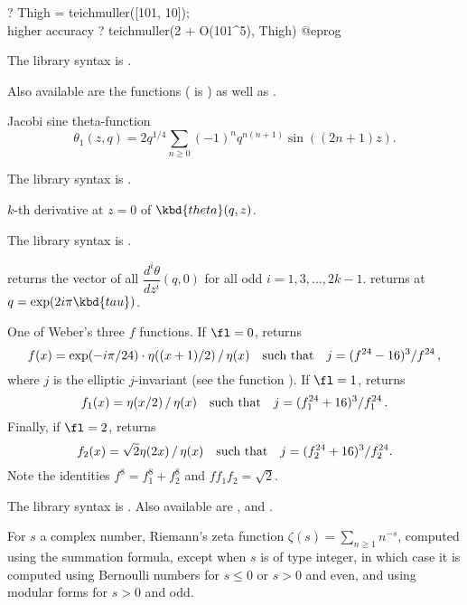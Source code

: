 ? Thigh = teichmuller([101, 10]); \\ higher accuracy
? teichmuller(2 + O(101^5), Thigh)
@eprog

The library syntax is .

Also available are the functions  ( is
) as well as
.

\label{se:theta}
Jacobi sine theta-function
$$ \theta_1(z, q) = 2q^{1/4} \sum_{n\geq 0} (-1)^n q^{n(n+1)} \sin((2n+1)z).$$

The library syntax is .

\label{se:thetanullk}
$k$-th derivative at $z=0$ of $\kbd{theta}(q,z)$.

The library syntax is .

 returns the vector
of all $\dfrac{d^i\theta}{dz^i}(q,0)$ for all odd $i = 1, 3, \dots, 2k-1$.
 returns
 at $q = \exp(2i\pi \kbd{tau})$.

\label{se:weber}
One of Weber's three $f$ functions.
If $\fl=0$, returns
$$f(x)=\exp(-i\pi/24)\cdot\eta((x+1)/2)\,/\,\eta(x) \quad\hbox{such that}\quad
j=(f^{24}-16)^3/f^{24}\,,$$
where $j$ is the elliptic $j$-invariant  (see the function ).
If $\fl=1$, returns
$$f_1(x)=\eta(x/2)\,/\,\eta(x)\quad\hbox{such that}\quad
j=(f_1^{24}+16)^3/f_1^{24}\,.$$
Finally, if $\fl=2$, returns
$$f_2(x)=\sqrt{2}\eta(2x)\,/\,\eta(x)\quad\hbox{such that}\quad
j=(f_2^{24}+16)^3/f_2^{24}.$$
Note the identities $f^8=f_1^8+f_2^8$ and $ff_1f_2=\sqrt2$.

The library syntax is .
Also available are ,
 and .

\label{se:zeta}
For $s$ a complex number, Riemann's zeta
function  $\zeta(s)=\sum_{n\ge1}n^{-s}$,
computed using the  summation formula, except
when $s$ is of type integer, in which case it is computed using
Bernoulli numbers for $s\le0$ or $s>0$ and
even, and using modular forms for $s>0$ and odd.

